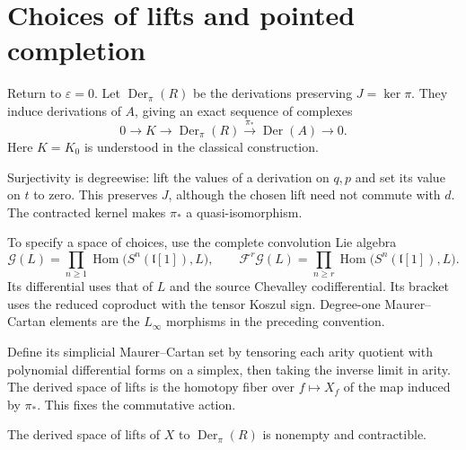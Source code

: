 \section{Choices of lifts and pointed completion}

Return to $\varepsilon=0$. Let $\operatorname{Der}_\pi(R)$
be the derivations preserving $J=\ker\pi$. They induce
derivations of $A$, giving an exact sequence of complexes
\[
 0\longrightarrow K\longrightarrow\operatorname{Der}_\pi(R)
   \xrightarrow{\pi_*}\operatorname{Der}(A)\longrightarrow0.
\]
Here $K=K_0$ is understood in the classical construction.

Surjectivity is degreewise: lift the values of a derivation on
$q,p$ and set its value on $t$ to zero. This preserves $J$,
although the chosen lift need not commute with $d$.
The contracted kernel makes $\pi_*$ a quasi-isomorphism.

To specify a space of choices, use the complete convolution
Lie algebra
\[
 \mathcal G(L)=\prod_{n\geq1}
   \operatorname{Hom}\bigl(S^n(\mathfrak l[1]),L\bigr),
 \qquad
 \mathcal F^r\mathcal G(L)=\prod_{n\geq r}
   \operatorname{Hom}\bigl(S^n(\mathfrak l[1]),L\bigr).
\]
Its differential uses that of $L$ and the source Chevalley
codifferential. Its bracket uses the reduced coproduct with
the tensor Koszul sign. Degree-one Maurer--Cartan elements are
the $L_\infty$ morphisms in the preceding convention.

Define its simplicial Maurer--Cartan set by tensoring each
arity quotient with polynomial differential forms on a simplex,
then taking the inverse limit in arity. The derived space of
lifts is the homotopy fiber over $f\mapsto X_f$ of the map
induced by $\pi_*$. This fixes the commutative action.

\begin{proposition}\label{mht:prop:contractible-action-lifts}
The derived space of lifts of $X$ to
$\operatorname{Der}_\pi(R)$ is nonempty and contractible.
\end{proposition}

